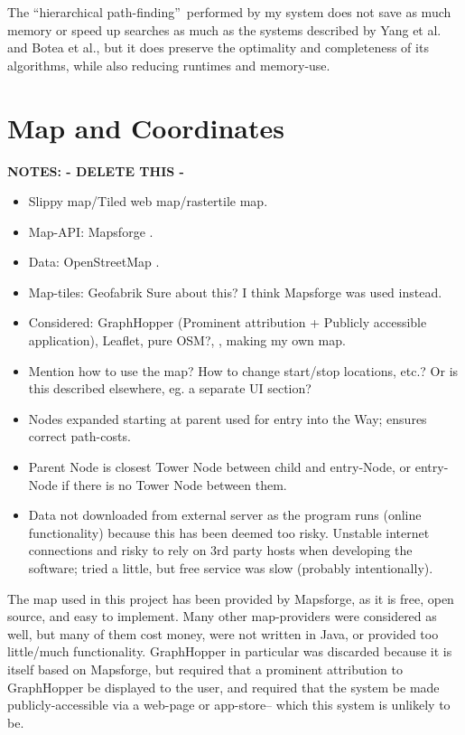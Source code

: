 The \textquotedblleft hierarchical path-finding\textquotedblright~performed by my system does not save as much memory or speed up searches as much as the systems described by Yang et al.\cite{CCAI07} and Botea et al.\cite{botea-etal-jogd04}, but it does preserve the optimality and completeness of its algorithms, while also reducing runtimes and memory-use.

\section{Map and Coordinates}
\textbf{NOTES: - DELETE THIS -}
\begin{itemize}
	\item Slippy map/Tiled web map/rastertile map.
	\item Map-API: Mapsforge \cite{Mapsforge}.
	\item Data: OpenStreetMap \cite{OSM}.
	\item Map-tiles: Geofabrik\cite{geofabrik} Sure about this? I think Mapsforge\cite{Mapsforge_map-tiles} was used instead.
	\item Considered: GraphHopper (Prominent attribution + Publicly accessible application), Leaflet, pure OSM?, , making my own map.
	\item Mention how to use the map? How to change start/stop locations, etc.? Or is this described elsewhere, eg. a separate UI section?
	\item Nodes expanded starting at parent used for entry into the Way; ensures correct path-costs.
	\item Parent Node is closest Tower Node between child and entry-Node, or entry-Node if there is no Tower Node between them.
		\item Data not downloaded from external server as the program runs (online functionality) because this has been deemed too risky. Unstable internet connections and risky to rely on 3rd party hosts when developing the software; tried a little, but free service was slow (probably intentionally).
\end{itemize}

The map used in this project has been provided by Mapsforge\cite{Mapsforge,Mapsforge_map-tiles}, as it is free, open source, and easy to implement.
Many other map-providers were considered as well\cite{Graphhopper,mapbox,cloudmade,omniscale,openlayers,GoogleMaps,osrm,geofabrik}, but many of them cost money, were not written in Java, or provided too little/much functionality. GraphHopper\cite{Graphhopper} in particular was discarded because it is itself based on Mapsforge\cite{Mapsforge}, but required that a prominent attribution to GraphHopper be displayed to the user, and required that the system be made publicly-accessible via a web-page or app-store-- which this system is unlikely to be.

